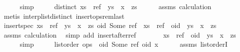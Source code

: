 \begin{isabellebody}
\ \ \ \ \isamarkupfalse%
\ simp\isanewline
\ \ \isamarkupfalse%
\ \isamarkupfalse%
\ {\isachardoublequoteopen}distinct\ {\isacharparenleft}xs\ {\isacharat}\ ref\ {\isacharhash}\ {\isacharparenleft}ys\ {\isacharat}\ {\isacharbrackleft}x{\isacharbrackright}\ {\isacharat}\ zs{\isacharparenright}{\isacharparenright}{\isachardoublequoteclose}\isanewline
\ \ \ \ \isamarkupfalse%
\ assms{\isacharparenleft}{}{\isacharparenright}\ calculation\ \isamarkupfalse%
\ {\isacharparenleft}metis\ interp{\isacharunderscore}list{\isacharunderscore}distinct\ insert{\isacharunderscore}ops{\isacharunderscore}rem{\isacharunderscore}last{\isacharparenright}\isanewline
\ \ \isamarkupfalse%
\ {\isachardoublequoteopen}insert{\isacharunderscore}spec\ {\isacharparenleft}xs\ {\isacharat}\ ref\ {\isacharhash}\ {\isacharparenleft}ys\ {\isacharat}\ {\isacharbrackleft}x{\isacharbrackright}\ {\isacharat}\ zs{\isacharparenright}{\isacharparenright}\ {\isacharparenleft}oid{\isacharcomma}\ Some\ ref{\isacharparenright}\ {\isacharequal}\ xs\ {\isacharat}\ ref\ {\isacharhash}\ oid\ {\isacharhash}\ {\isacharparenleft}ys\ {\isacharat}\ {\isacharbrackleft}x{\isacharbrackright}\ {\isacharat}\ zs{\isacharparenright}{\isachardoublequoteclose}\isanewline
\ \ \ \ \isamarkupfalse%
\ assms{\isacharparenleft}{}{\isacharparenright}\ calculation\ \isamarkupfalse%
\ {\isacharparenleft}simp\ add{\isacharcolon}\ insert{\isacharunderscore}after{\isacharunderscore}ref{\isacharparenright}\isanewline
\ \ \isamarkupfalse%
\ \isamarkupfalse%
\ {\isachardoublequoteopen}{\isachardot}{\isachardot}{\isachardot}\ {\isacharequal}\ {\isacharparenleft}xs\ {\isacharat}\ {\isacharbrackleft}ref{\isacharbrackright}{\isacharparenright}\ {\isacharat}\ {\isacharbrackleft}oid{\isacharbrackright}\ {\isacharat}\ ys\ {\isacharat}\ {\isacharbrackleft}x{\isacharbrackright}\ {\isacharat}\ zs{\isachardoublequoteclose}\isanewline
\ \ \ \ \isamarkupfalse%
\ simp\isanewline
\ \ \isamarkupfalse%
\ \isamarkupfalse%
\ {\isachardoublequoteopen}list{\isacharunderscore}order\ {\isacharparenleft}ops\ {\isacharat}\ {\isacharbrackleft}{\isacharparenleft}oid{\isacharcomma}\ Some\ ref{\isacharparenright}{\isacharbrackright}{\isacharparenright}\ oid\ x{\isachardoublequoteclose}\isanewline
\ \ \ \ \isamarkupfalse%
\ assms{\isacharparenleft}{}{\isacharparenright}\ list{\isacharunderscore}orderI\ \isamarkupfalse%

\end{isabellebody}
